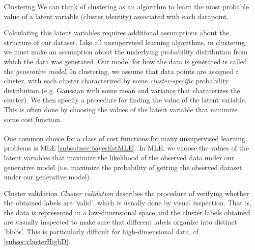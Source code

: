 \begin{mybox}{Clustering}
We can think of clustering as an algorithm to learn the most probable value of a latent variable (cluster identity) associated with each datapoint.
\end{mybox}
 Calculating this latent variables requires additional assumptions about the structure of our dataset. Like all unsupervised learning algorithms, in clustering we must make an assumption about the underlying probability distribution from which the data was generated. Our model for how the data is generated is called the \emph{generative model}. In clustering, we assume that data points are assigned a cluster, with each cluster characterized by some \emph{cluster-specific} probability distribution  (e.g. Gaussian with some mean and variance that charaterizes the cluster). We then specify a procedure for finding the value of the latent variable. This is often done by choosing the values of the latent variable that minimize some cost function.\\
 \\
 One common choice for a class of cost functions for many unsupervised learning problems is MLE \ref{subsubsec:bayesEstMLE}. In MLE, we choose the values of the latent variables that maximize the likelihood of the observed data under our generative model (i.e. maximize the probability of getting the observed dataset under our generative model).
 
 
 
 
 
 
 
 \begin{mybox}{Cluster validation}
 	\label{subsubsec:clusterConceptsValidation}
 	\emph{Cluster validation} describes the procedure of verifying whether the obtained labels are ’valid’, which is usually done by visual inspection. That is, the data is represented in a low-dimensional space and the cluster labels obtained are visually inspected to make sure that different labels organize into distinct ’blobs’. This is particularly difficult for high-dimensional data, cf. \ref{subsec:clusterHighD}.
 \end{mybox}
 
 
 
 
